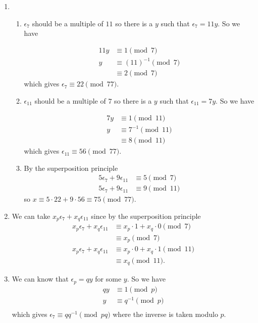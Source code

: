 \begin{solution}
  \begin{enumerate}
    \item
      \begin{enumerate}
        \item
          $\epsilon_7$ should be a multiple of $11$ so there is a $y$ such
          that $\epsilon_7 = 11y$.
          So we have

          \begin{align*}
            11y & \equiv 1 \pmod{7}\\
              y & \equiv (11)^{-1} \pmod{7}\\
                & \equiv 2 \pmod{7}
          \end{align*}
          which gives $\epsilon_7 \equiv 22 \pmod{77}$.
        \item
          $\epsilon_{11}$ should be a multiple of $7$ so there is a $y$ such
          that $\epsilon_{11} = 7y$.
          So we have

          \begin{align*}
            7y & \equiv 1 \pmod{11}\\
             y & \equiv 7^{-1} \pmod{11}\\
               & \equiv 8 \pmod{11}
          \end{align*}
          which gives $\epsilon_{11} \equiv 56 \pmod{77}$.
        \item
          By the superposition principle
          \begin{align*}
            5\epsilon_7 + 9\epsilon_{11} & \equiv 5 \pmod{7}\\
            5\epsilon_7 + 9\epsilon_{11} & \equiv 9 \pmod{11}
          \end{align*}
          so $x \equiv 5 \cdot 22 + 9 \cdot 56 \equiv 75 \pmod{77}$.
        \end{enumerate}
      \item
        We can take $x_p\epsilon_7 + x_q\epsilon_{11}$
        since by the superposition principle
        \begin{align*}
          x_p\epsilon_7 + x_q\epsilon_{11} & \equiv x_p \cdot 1 + x_q \cdot 0 \pmod{7}\\
                                           & \equiv x_p \pmod{7}\\
          x_p\epsilon_7 + x_q\epsilon_{11} & \equiv x_p \cdot 0 + x_q \cdot 1 \pmod{11}\\
                                           & \equiv x_q \pmod{11}.
        \end{align*}
      \item
        We can know that $\epsilon_p = qy$ for some $y$.
        So we have
        \begin{align*}
          qy & \equiv 1 \pmod{p}\\
           y & \equiv q^{-1} \pmod{p}\\
        \end{align*}
        which gives $\epsilon_7 \equiv qq^{-1} \pmod{pq}$
        where the inverse is taken modulo $p$.


\end{enumerate}
\end{solution}
